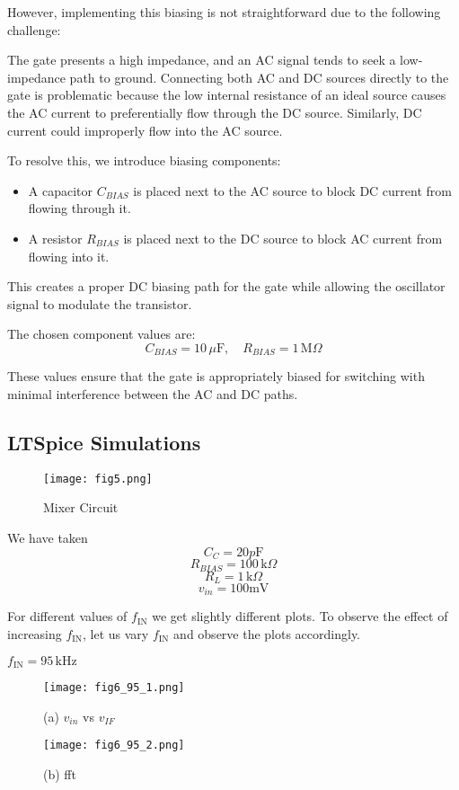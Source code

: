 \documentclass[conference]{IEEEtran}
\begin{document}
However, implementing this biasing is not straightforward due to the following challenge:

The gate presents a high impedance, and an AC signal tends to seek a low-impedance path to ground. Connecting both AC and DC sources directly to the gate is problematic because the low internal resistance of an ideal source causes the AC current to preferentially flow through the DC source. Similarly, DC current could improperly flow into the AC source.

To resolve this, we introduce biasing components:

\begin{itemize}
    \item A capacitor \( C_{BIAS} \) is placed next to the AC source to block DC current from flowing through it.
    \item A resistor \( R_{BIAS} \) is placed next to the DC source to block AC current from flowing into it.
\end{itemize}

This creates a proper DC biasing path for the gate while allowing the oscillator signal to modulate the transistor.

The chosen component values are:
\[
C_{BIAS} = 10\,\mu\text{F}, \quad R_{BIAS} = 1\,\text{M}\Omega
\]

These values ensure that the gate is appropriately biased for switching with minimal interference between the AC and DC paths.

\subsection{LTSpice Simulations}

\begin{figure}[H]
    \centering
    \texttt{[image: fig5.png]}
    \caption{Mixer Circuit}
\end{figure}

We have taken 
\[
C_{C} = 20p\text{F}
\]
\[
R_{BIAS} = 100\,\text{k}\Omega
\]
\[
R_{L} = 1\,\text{k}\Omega
\]
\[
v_{in} = 100\text{mV}
\]

For different values of \(f_{\text{IN}}\) we get slightly different plots. To observe the effect of increasing \(f_{\text{IN}}\), let us vary \(f_{\text{IN}}\) and observe the plots accordingly.

\clearpage
\textbf{\boldmath\( f_{\text{IN}} = 95\,\text{kHz} \)}
\begin{figure}[H]
    \centering
    \texttt{[image: fig6\_95\_1.png]}
    \caption{(a) \( v_{in} \) vs \( v_{IF} \)}
\end{figure}
\begin{figure}[H]
    \centering
    \texttt{[image: fig6\_95\_2.png]}
    \caption{(b) fft}
\end{figure}
\end{document}
